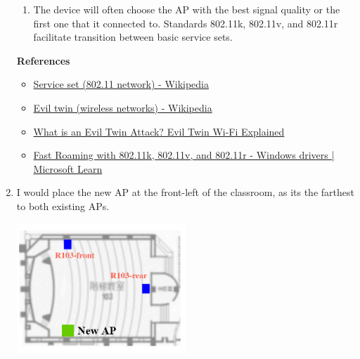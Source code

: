 \documentclass[12pt, a4paper]{article}
\begin{document}
\begin{enumerate}[label=(\alph*)]
\begin{enumerate}[label=(\arabic*)]
      \item The device will often choose the AP with the best signal quality or the first
      one that it connected to. Standards 802.11k, 802.11v, and 802.11r facilitate transition
      between basic service sets.
    \end{enumerate}
    \textbf{References}
    \begin{footnotesize}
      \begin{itemize}
        \item \href{https://en.wikipedia.org/wiki/Service_set_(802.11_network)}{Service set (802.11 network) - Wikipedia}
        \item \href{https://en.wikipedia.org/wiki/Evil_twin_(wireless_networks)}{Evil twin (wireless networks) - Wikipedia}
        \item \href{https://usa.kaspersky.com/resource-center/preemptive-safety/evil-twin-attacks}{What is an Evil Twin Attack? Evil Twin Wi-Fi Explained}
        \item \href{https://learn.microsoft.com/en-us/windows-hardware/drivers/network/fast-roaming-with-802-11k--802-11v--and-802-11r}{Fast Roaming with 802.11k, 802.11v, and 802.11r - Windows drivers | Microsoft Learn}
      \end{itemize}
    \end{footnotesize}

    \item I would place the new AP at the front-left of the classroom, as its the
    farthest to both existing APs.

    \includegraphics[width=0.5\textwidth]{3-b_new_ap.png}
  \end{enumerate}
\end{document}
